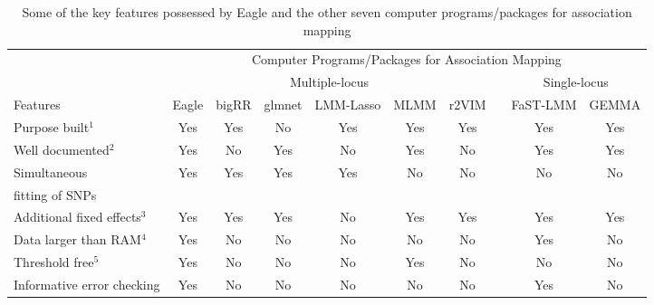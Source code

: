 \documentclass{article}
\begin{document}
\begin{landscape}

\begin{table}
\caption{Some of the key features possessed by Eagle and the other seven computer programs/packages for association mapping}
\label{suptabsummary}

\begin{tabular}{lccccccccc} 
                                &  \multicolumn{9}{c}{Computer Programs/Packages for Association Mapping} \\ \cline{2-10}
                                 & \multicolumn{6}{c}{Multiple-locus}  & & \multicolumn{2}{c}{Single-locus} \\  \cline{2-7}   \cline{9-10}
 Features                 & Eagle  & bigRR & glmnet & LMM-Lasso & MLMM & r2VIM     & & FaST-LMM & GEMMA \\  \hline
Purpose built$^1$    &   Yes     &    Yes      &  No   &  Yes  &  Yes  &  Yes && Yes & Yes           \\ [0.2cm]
Well documented$^2$           & Yes &   No   & Yes   & No     &   Yes     & No          && Yes    &    Yes    \\  [0.2cm]
Simultaneous   &    Yes     &    Yes        &   Yes          &      Yes             &  No          &  No              &&   No   &  No     \\  
fitting of SNPs     &         &            &             &                   &            &                &&      &      \\  [0.2cm]
Additional fixed effects$^3$          &   Yes   &      Yes      &     Yes    &  No                 &      Yes      &      Yes          &&      Yes & Yes     \\   [0.2cm]
Data larger than RAM$^4$                   &   Yes    &      No      & No          &  No    &  No    &   No     && Yes      & No    \\  [0.2cm]
Threshold free$^5$        &    Yes     &  No    &  No         &    No               &     Yes       &  No              &&  No   & No      \\  [0.2cm]
Informative error checking           &  Yes      &     No        &      No     &           No        &      No       &         No       && Yes  & No \\ \hline


\end{tabular}
\end{table}
\end{landscape}
\end{document}

